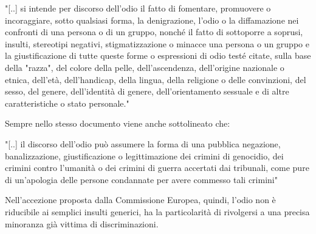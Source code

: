 \begin{displayquote}
	"[..] si intende per discorso dell’odio il fatto di fomentare, promuovere o incoraggiare, sotto qualsiasi forma, la denigrazione, l’odio o la diffamazione nei confronti di una persona o di un gruppo, nonché il fatto di sottoporre a soprusi, insulti, stereotipi negativi, stigmatizzazione o minacce una persona o un gruppo e la giustificazione di tutte queste forme o espressioni di odio testé citate, sulla base della "razza", del colore della pelle, dell’ascendenza, dell’origine nazionale o etnica, dell’età, dell’handicap, della lingua, della religione o delle convinzioni, del sesso, del genere, dell’identità di genere, dell’orientamento sessuale e di altre caratteristiche o stato personale."    
\end{displayquote}
Sempre nello stesso documento viene anche sottolineato che:
\begin{displayquote}
	"[..] il discorso dell’odio può assumere la forma di una pubblica negazione, banalizzazione, giustificazione o legittimazione dei crimini di genocidio, dei crimini contro l’umanità o dei crimini di guerra accertati dai tribunali, come pure di un’apologia delle persone condannate per avere commesso tali crimini"    
\end{displayquote}
Nell’accezione proposta dalla Commissione Europea, quindi,  l’odio non è riducibile ai semplici insulti generici, ha la particolarità di rivolgersi a una precisa minoranza già vittima di discriminazioni.


